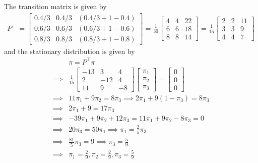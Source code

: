 The transition matrix is given by
\begin{align*}
    P
     & =
    \begin{bmatrix}
        0.4/3 & 0.4/3 & (0.4/3 + 1 - 0.4) \\
        0.6/3 & 0.6/3 & (0.6/3 + 1 - 0.6) \\
        0.8/3 & 0.8/3 & (0.8/3 + 1 - 0.8)
    \end{bmatrix}
    =
    \frac{1}{30}
    \begin{bmatrix}
        4 & 4 & 22 \\
        6 & 6 & 18 \\
        8 & 8 & 14
    \end{bmatrix}
    =
    \frac{1}{15}
    \begin{bmatrix}
        2 & 2 & 11 \\
        3 & 3 & 9  \\
        4 & 4 & 7
    \end{bmatrix}
\end{align*}
and the stationary distribution is given by
\begin{align*}
     &
    \pi
    =
    P^\top \pi
    \\
    \implies
     &
    \frac{1}{15}
    \begin{bmatrix}
        -13 & 3   & 4  \\
        2   & -12 & 4  \\
        11  & 9   & -8
    \end{bmatrix}
    \begin{bmatrix}
        \pi_{1} \\
        \pi_{2} \\
        \pi_{3}
    \end{bmatrix}
    =
    \begin{bmatrix}
        0 \\
        0 \\
        0
    \end{bmatrix}
    \\
    \implies
     &
    11 \pi_{1} + 9 \pi_{2}
    =
    8 \pi_{3}
    \implies
    2 \pi_{1} + 9(1 - \pi_{3})
    =
    8 \pi_{3}
    \\
    \implies
     &
    2 \pi_{1} + 9
    =
    17 \pi_{3}
    \\
    \implies
     &
    -39 \pi_{1} + 9 \pi_{2} + 12 \pi_{3}
    =
    11 \pi_{1} + 9 \pi_{2} - 8 \pi_{3}
    =
    0
    \\
    \implies
     &
    20 \pi_{3}
    =
    50 \pi_{1}
    \implies
    \pi_{1}
    =
    \frac{2}{5}
    \pi_{3}
    \\
    \implies
     &
    \frac{81}{5} \pi_{3}
    =
    9
    \implies
    \pi_{3}
    =
    \frac{5}{9}
    \\
    \implies
     &
    \boxed{
        \pi_{1}
        =
        \frac{2}{9}
        ,
        \pi_{2}
        =
        \frac{2}{9}
        ,
        \pi_{3}
        =
        \frac{5}{9}
    }
\end{align*}
